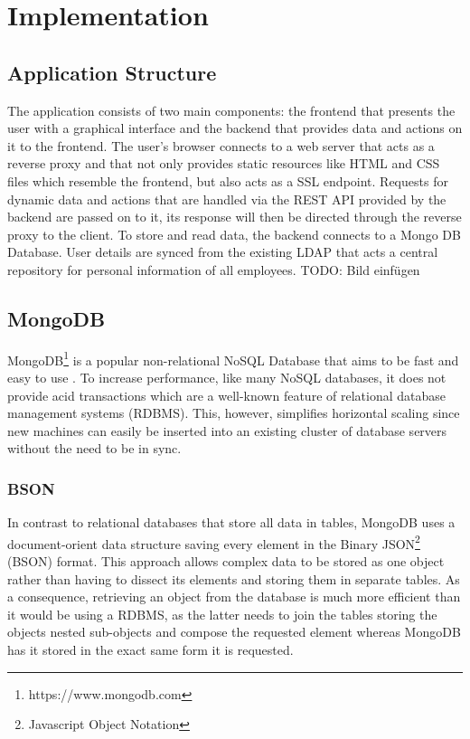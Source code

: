 \chapter{Implementation}
\section{Application Structure}
The application consists of two main components: the frontend that presents the user with a graphical interface and the backend that provides data and actions on it to the frontend.
The user's browser connects to a web server that acts as a reverse proxy and that not only provides static resources like HTML and CSS files which resemble the frontend, but also acts as a SSL endpoint.
Requests for dynamic data and actions that are handled via the REST API provided by the backend are passed on to it, its response will then be directed through the reverse proxy to the client.
To store and read data, the backend connects to a Mongo DB Database. User details are synced from the existing LDAP that acts a central repository for personal information of all employees.
TODO: Bild einfügen

\section{MongoDB}
MongoDB\footnote{https://www.mongodb.com} is a popular non-relational NoSQL Database that aims to be fast and easy to use \cite[p. 10]{MongoGuide}. To increase performance, like many NoSQL databases, it does not provide acid transactions which are a well-known feature of relational database management systems (RDBMS). This, however, simplifies horizontal scaling since new machines can easily be inserted into an existing cluster of database servers without the need to be in sync. \cite[p. 3]{MongoGuide}

\subsection{BSON}
\label{BSON}
In contrast to relational databases that store all data in tables, MongoDB uses a document-orient data structure saving every element in the Binary JSON\footnote{Javascript Object Notation} (BSON) format. This approach allows complex data to be stored as one object rather than having to dissect its elements and storing them in separate tables. As a consequence, retrieving an object from the database is much more efficient than it would be using a RDBMS, as the latter needs to join the tables storing the objects nested sub-objects and compose the requested element whereas MongoDB has it stored in the exact same form it is requested. \cite[p. 10]{MongoGuide}

